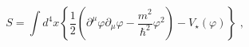 \begin{equation}
S=\int d^{4}x\left\{  \frac{1}{2}\left(  \partial^{\mu}\varphi\partial_{\mu
}\varphi-\frac{m^{2}}{\hbar^{2}}\varphi^{2}\right)  -V_{\star}\left(
\varphi\right)  \right\}  \text{ \ ,}\label{10}%
\end{equation}

